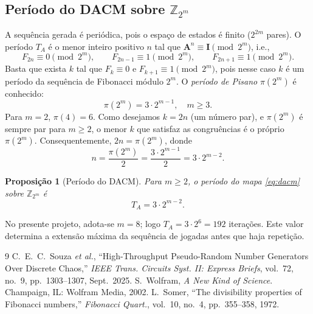 \documentclass[12pt,a4paper]{article}
\newtheorem{proposition}[theorem]{Proposição}
\begin{document}
\subsection{Período do DACM sobre \(\mathbb{Z}_{2^m}\)}
A sequência gerada é periódica, pois o espaço de estados é finito (\(2^{2m}\) pares). O período \(T_A\) é o menor inteiro positivo \(n\) tal que \(\mathbf{A}^n \equiv \mathbf{I} \pmod{2^m}\), i.e.,
\[
F_{2n}\equiv 0 \pmod{2^m}, \qquad F_{2n-1}\equiv 1 \pmod{2^m},\qquad F_{2n+1}\equiv 1 \pmod{2^m}.
\]
Basta que exista \(k\) tal que \(F_k\equiv 0\) e \(F_{k+1}\equiv 1 \pmod{2^m}\), pois nesse caso \(k\) é um período da sequência de Fibonacci módulo \(2^m\). O \textit{período de Pisano} \(\pi(2^m)\) é conhecido:
\[
\pi(2^m) = 3\cdot 2^{m-1}, \quad m\ge 3.
\]
Para \(m=2\), \(\pi(4)=6\). Como desejamos \(k=2n\) (um número par), e \(\pi(2^m)\) é sempre par para \(m\ge2\), o menor \(k\) que satisfaz as congruências é o próprio \(\pi(2^m)\). Consequentemente, \(2n = \pi(2^m)\), donde
\[
n = \frac{\pi(2^m)}{2} = \frac{3\cdot 2^{m-1}}{2} = 3\cdot 2^{m-2}.
\]

\begin{proposition}[Período do DACM]
Para \(m\ge 2\), o período do mapa \eqref{eq:dacm} sobre \(\mathbb{Z}_{2^m}\) é
\[
T_A = 3\cdot 2^{m-2}.
\]
\end{proposition}
No presente projeto, adota-se \(m=8\); logo \(T_A = 3\cdot 2^{6} = 192\) iterações. Este valor determina a extensão máxima da sequência de jogadas antes que haja repetição.

\begin{thebibliography}{9}
C.~E.~C.~Souza \textit{et al.}, ``High-Throughput Pseudo-Random Number Generators Over Discrete Chaos,'' \textit{IEEE Trans. Circuits Syst. II: Express Briefs}, vol.~72, no.~9, pp.~1303--1307, Sept.~2025.
S.~Wolfram, \textit{A New Kind of Science}. Champaign, IL: Wolfram Media, 2002.
L.~Somer, ``The divisibility properties of Fibonacci numbers,'' \textit{Fibonacci Quart.}, vol.~10, no.~4, pp.~355--358, 1972.
\end{thebibliography}
\end{document}
